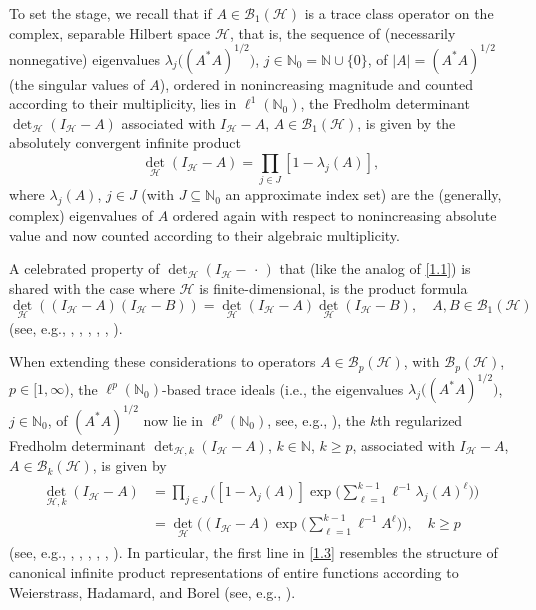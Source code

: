 \documentclass[reqno,10pt,centertags]{amsart}
\newcommand{\bbN}{{\mathbb{N}}}
\newcommand{\cB}{{\mathcal B}}
\newcommand{\cH}{{\mathcal H}}
\newcommand{\dott}{\,\cdot\,}
\newcommand{\lb}{\label}
\let\geq\geqslant
\newcounter{count}
\numberwithin{equation}{section}
\theoremstyle{remark}
\begin{document}
To set the stage, we recall that if $A \in \cB_1(\cH)$ is a trace class operator on the complex, separable Hilbert space $\cH$, that is, the sequence of (necessarily nonnegative) eigenvalues $\lambda_j\big((A^*A)^{1/2}\big)$, $j \in \bbN_0 = \bbN \cup \{0\}$, of $|A| = (A^*A)^{1/2}$ (the singular values of $A$), ordered in nonincreasing magnitude and counted according to their multiplicity, lies in $\ell^1(\bbN_0)$, the Fredholm determinant 
${\det}_{\cH}(I_{\cH} - A)$ associated with $I_{\cH} - A$, $A \in \cB_1(\cH)$, is given by the absolutely convergent infinite product
\begin{equation}
{\det}_{\cH} (I_{\cH} - A) = \prod_{j \in J} [1 -  \lambda_j(A)],    \lb{1.1} 
\end{equation}  
where $\lambda_j(A)$, $j \in J$ (with $J \subseteq \bbN_0$ an approximate index set) are the (generally, complex) eigenvalues of $A$ ordered again with respect to nonincreasing absolute value and now counted according to their algebraic multiplicity. 

A celebrated property of ${\det}_{\cH}(I_{\cH} - \dott)$ that (like the analog of \eqref{1.1}) is shared with the case where $\cH$ is finite-dimensional, is the product formula 
\begin{equation}
{\det}_{\cH} ((I_{\cH} - A) (I_{\cH} - B)) = {\det}_{\cH} (I_{\cH} - A) {\det}_{\cH} (I_{\cH} - B), 
\quad A, B \in \cB_1(\cH)     \lb{1.2} 
\end{equation}
(see, e.g., \cite[pp.~162--163]{GK69}, \cite[Theorem~XIII.105\,$(a)$]{RS78}, \cite[Theorem~3.8]{Si77}, 
\cite[Theorem~3.5\,$(a)$]{Si05}, \cite[Theorem~3.4.10\,$(f)$]{Si15}, \cite[p.~44]{Ya92}).

When extending these considerations to operators $A \in \cB_p(\cH)$, with $ \cB_p(\cH)$, $p \in [1,\infty)$, the 
$\ell^p(\bbN_0)$-based trace ideals (i.e., the eigenvalues $\lambda_j\big((A^*A)^{1/2}\big)$, $j \in \bbN_0$, of 
$(A^*A)^{1/2}$ now lie in $\ell^p(\bbN_0)$, see, e.g., \cite[Sect.~III.7]{GK69}), the $k$th regularized
Fredholm determinant ${\det}_{\cH,k}(I_{\cH} - A)$, $k \in \bbN$, $ k \geq p$, associated with $I_{\cH} - A$, 
$A \in \cB_k(\cH)$, is given by 
\begin{align}
\begin{split} 
{\det}_{\cH,k} (I_{\cH} - A) &= \prod_{j \in J} \bigg([1 -  \lambda_j(A)] \exp\bigg(\sum_{\ell=1}^{k-1} \ell^{-1} 
\lambda_j(A)^{\ell}\bigg)\bigg)      \lb{1.3} \\
&= {\det}_{\cH} \bigg((I_{\cH} - A) \exp\bigg(\sum_{\ell=1}^{k-1} \ell^{-1} A^{\ell}\bigg)\bigg), \quad k \geq p
\end{split} 
\end{align}
(see, e.g., \cite[pp.~1106--1116]{DS88}, \cite[pp.~166--169]{GK69}, \cite{Si77}, \cite[pp.~75--76]{Si05}, 
\cite[pp.~187--191]{Si15}, \cite[p.~44]{Ya92}). In particular, the first line in \eqref{1.3} resembles the structure of canonical infinite product representations of entire functions according to Weierstrass, Hadamard, and Borel (see,
e.g., \cite[Vol. 2, Ch.~II.10]{Ma85}).  
\end{document}
